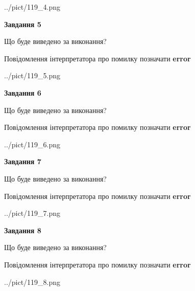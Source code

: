 \documentclass[12pt, ukrainian]{article}
\begin{document}
{\begin{center}
	{../pict/119_4.png}
\end{center}
\newpage

{\begin {center}\textbf{Завдання 5}\end {center}}\par
Що буде виведено за виконання? \par
Повідомлення інтерпретатора про помилку позначати \textbf{error}

\begin{center}
	{../pict/119_5.png}
\end{center}
\newpage

{\begin {center}\textbf{Завдання 6}\end {center}}\par
Що буде виведено за виконання? \par
Повідомлення інтерпретатора про помилку позначати \textbf{error}

\begin{center}
	{../pict/119_6.png}
\end{center}
\newpage

{\begin {center}\textbf{Завдання 7}\end {center}}\par
Що буде виведено за виконання? \par
Повідомлення інтерпретатора про помилку позначати \textbf{error}

\begin{center}
	{../pict/119_7.png}
\end{center}
\newpage

{\begin {center}\textbf{Завдання 8}\end {center}}\par
Що буде виведено за виконання? \par
Повідомлення інтерпретатора про помилку позначати \textbf{error}

\begin{center}
	{../pict/119_8.png}
\end{center}
\newpage

}
\end{document}
